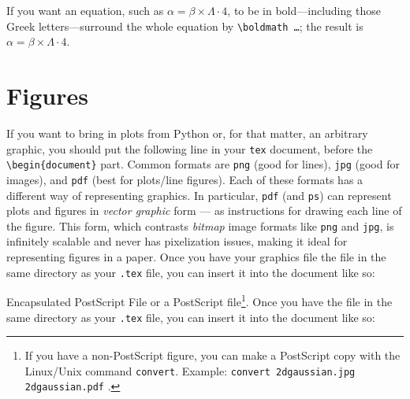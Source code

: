 \documentclass[12pt,preprint]{aastex}
\begin{document}
If you want an equation, such as $\alpha = \beta \times \Lambda \cdot
4$, to be in bold---including those Greek letters---surround the whole
equation by {\tt \verb&\&boldmath \dots }; the result is 
{\boldmath $\alpha = \beta \times \Lambda \cdot 4$}.

\section{Figures}\label{figsec}

If you want to bring in plots from Python or, for that matter, an
arbitrary graphic, you 
should put the following line in your {\tt tex}
document, before the \verb$\begin{document}$ part. Common
formats are {\tt png} (good for lines), {\tt jpg} (good for images), and {\tt pdf}
(best for plots/line figures).  Each of these formats has a different way of representing
graphics.  In particular, {\tt pdf} (and {\tt ps}) can represent plots and figures 
in {\it vector graphic} form --- as instructions for drawing each line of the figure.  This 
form, which contrasts {\it bitmap} image formats like {\tt png} and {\tt jpg}, is
infinitely scalable and never has pixelization issues, making it ideal for representing
figures in a paper. Once you have your graphics file the
file in the same directory as your {\tt *.tex} file, you can insert it
into the document like so:


Encapsulated PostScript File or a PostScript file\footnote{If you have a
  non-PostScript figure, you can make a PostScript copy with the
  Linux/Unix command {\tt convert}. Example: {\tt convert 2dgaussian.jpg
    2dgaussian.pdf} .}.  Once you have the file in the same directory as
your \verb&.tex& file, you can insert it into the document like so:
\end{document}
